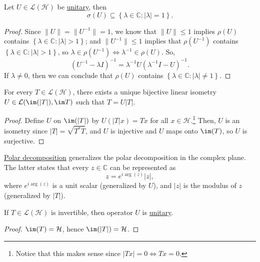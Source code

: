\begin{proposition}
	Let \(U\in \mathcal{L} (\mathcal{H} )\) be \hyperref[def:unitary-op]{unitary}, then
	\[
		\sigma (U) \subseteq \left\{ \lambda \in \mathbb{C} \colon \vert \lambda  \vert = 1 \right\}.
	\]
\end{proposition}
\begin{proof}
	Since \(\lVert U \rVert = \lVert U^{-1}  \rVert = 1\), we know that \(\lVert U \rVert \leq 1\) implies \(\rho (U)\) contains \(\left\{ \lambda \in \mathbb{C} \colon \vert \lambda \vert > 1 \right\} \); and \(\lVert U^{-1}  \rVert \leq 1\) implies that \(\rho (U^{-1} )\) contains \(\left\{ \lambda \in \mathbb{C} \colon \vert \lambda  \vert > 1 \right\} \), so \(\lambda \in \rho (U^{-1} ) \iff \lambda ^{-1} \in \rho (U)\). So,
	\[
		(U ^{-1}  - \lambda I)^{-1} = \lambda ^{-1} U(\lambda ^{-1} I- U)^{-1} .
	\]
	If \(\lambda \neq 0\), then we can conclude that \(\rho (U)\) contains \(\left\{ \lambda \in \mathbb{C} \colon \vert \lambda  \vert \neq 1 \right\} \).
\end{proof}

\begin{theorem}\label{thm:polar-decomposition}
	For every \(T\in \mathcal{L} (\mathcal{H} )\), there exists a unique bijective linear isometry \(U\in \mathcal{L} (\im (\vert T \vert ), \im T)\) such that \(T = U\vert T \vert \).
\end{theorem}
\begin{proof}
	Define \(U\) on \(\im(\vert T \vert )\) by \(U(\vert T \vert x) = Tx\) for all \(x\in \mathcal{H} \).\footnote{Notice that this makes sense since \(\vert Tx \vert = 0 \iff Tx = 0\).} Then, \(U\) is an isometry since \(\vert T \vert = \sqrt{T ^{\ast} T} \), and \(U\) is injective and \(U\) maps onto \(\im (T)\), so \(U\) is surjective.
\end{proof}

\hyperref[thm:polar-decomposition]{Polar decomposition} generalizes the polar decomposition in the complex plane. The latter states that every \(z\in \mathbb{C} \) can be represented as
\[
	z = e^{i \arg (z)} \vert z \vert,
\]
where \(e^{i \arg(z)}\) is a unit scalar (generalized by \(U\)), and \(\vert z \vert \) is the modulus of \(z\) (generalized by \(\vert T \vert\)).

\begin{theorem}\label{thm:polar-decomposition-for-invertible-op}
	If \(T\in \mathcal{L} (\mathcal{H} )\) is invertible, then operator \(U\) is \hyperref[def:unitary-op]{unitary}.
\end{theorem}
\begin{proof}
	\(\im(T) = \mathcal{H} \), hence \(\im(\vert T \vert ) = \mathcal{H} \).
\end{proof}


